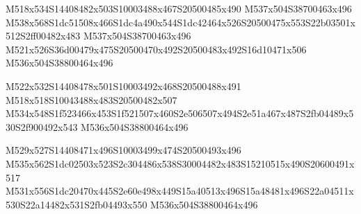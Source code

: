 \documentclass{article}
\begin{document}
\begin{multicols}{5}
\begin{center}
M518x534S14408482x503S10003488x467S20500485x490 %
M537x504S38700463x496 %
M538x568S1dc51508x466S1dc4a490x544S1dc42464x526S20500475x553S22b03501x512S2ff00482x483 %
M537x504S38700463x496 %
M521x526S36d00479x475S20500470x492S20500483x492S16d10471x506 %
M536x504S38800464x496 %

M522x532S14408478x501S10003492x468S20500488x491 %
M518x518S10043488x483S20500482x507 %
M534x548S1f523466x453S1f521507x460S2e506507x494S2e51a467x487S2fb04489x530S2f900492x543 %
M536x504S38800464x496 %

M529x527S14408471x496S10003499x474S20500493x496 %
M535x562S1dc02503x523S2c304486x538S30004482x483S15210515x490S20600491x517 %
M531x556S1dc20470x445S2e60e498x449S15a40513x496S15a48481x496S22a04511x530S22a14482x531S2fb04493x550 %
M536x504S38800464x496 %

\end{center}
\end{multicols}
\end{document}
